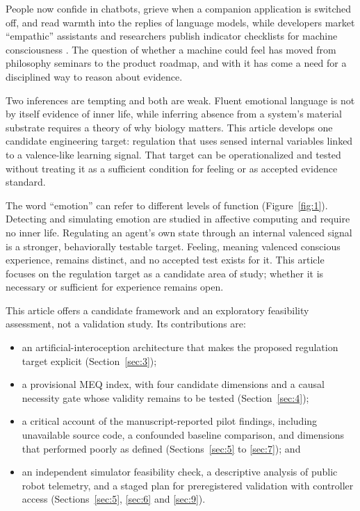 \documentclass[twoside,11pt]{article}
\begin{document}
People now confide in chatbots, grieve when a companion application is switched off, and read warmth into the replies of language models, while developers market ``empathic'' assistants and researchers publish indicator checklists for machine consciousness \citep{butlin2023}. The question of whether a machine could feel has moved from philosophy seminars to the product roadmap, and with it has come a need for a disciplined way to reason about evidence.

Two inferences are tempting and both are weak. Fluent emotional language is not by itself evidence of inner life, while inferring absence from a system's material substrate requires a theory of why biology matters. This article develops one candidate engineering target: regulation that uses sensed internal variables linked to a valence-like learning signal. That target can be operationalized and tested without treating it as a sufficient condition for feeling or as accepted evidence standard.

The word ``emotion'' can refer to different levels of function (Figure~\ref{fig:1}). Detecting and simulating emotion are studied in affective computing \citep{picard1997} and require no inner life. Regulating an agent's own state through an internal valenced signal is a stronger, behaviorally testable target. Feeling, meaning valenced conscious experience, remains distinct, and no accepted test exists for it. This article focuses on the regulation target as a candidate area of study; whether it is necessary or sufficient for experience remains open.

This article offers a candidate framework and an exploratory feasibility assessment, not a validation study. Its contributions are:

\begin{itemize}

\item
  an artificial-interoception architecture that makes the proposed regulation target explicit (Section~\ref{sec:3});
\item
  a provisional MEQ index, with four candidate dimensions and a causal necessity gate whose validity remains to be tested (Section~\ref{sec:4});
\item
  a critical account of the manuscript-reported pilot findings, including unavailable source code, a confounded baseline comparison, and dimensions that performed poorly as defined (Sections~\ref{sec:5} to \ref{sec:7}); and
\item
  an independent simulator feasibility check, a descriptive analysis of public robot telemetry, and a staged plan for preregistered validation with controller access (Sections~\ref{sec:5}, \ref{sec:6} and \ref{sec:9}).
\end{itemize}
\end{document}

